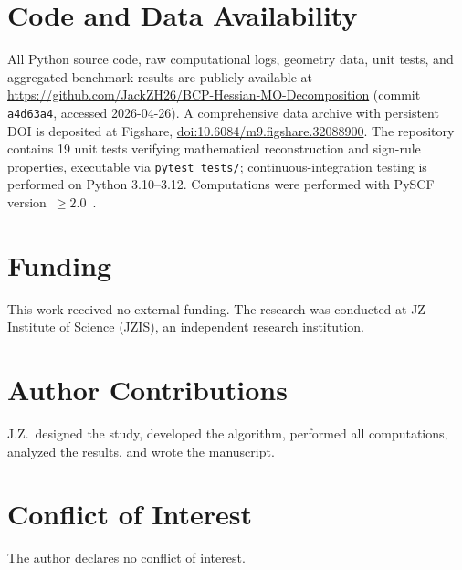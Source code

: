 \documentclass[twoside,natbib]{svjour3}
\begin{document}
\section*{Code and Data Availability}

All Python source code, raw computational logs, geometry data,
unit tests, and aggregated benchmark results are publicly available
at \url{https://github.com/JackZH26/BCP-Hessian-MO-Decomposition}
(commit \texttt{a4d63a4}, accessed 2026-04-26). A comprehensive
data archive with persistent DOI is deposited at Figshare,
\href{https://doi.org/10.6084/m9.figshare.32088900}{doi:10.6084/m9.figshare.32088900}.
The repository contains 19 unit tests verifying mathematical
reconstruction and sign-rule properties, executable via
\texttt{pytest tests/}; continuous-integration testing is performed
on Python 3.10--3.12. Computations were performed with PySCF
version~$\ge 2.0$~\citep{Sun2018,Sun2020}.

\section*{Funding}

This work received no external funding. The research was conducted
at JZ Institute of Science (JZIS), an independent research
institution.

\section*{Author Contributions}

J.Z.\ designed the study, developed the algorithm, performed all
computations, analyzed the results, and wrote the manuscript.

\section*{Conflict of Interest}

The author declares no conflict of interest.



\end{document}
